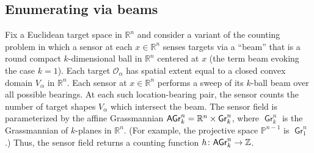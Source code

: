 \documentclass{psapm-l}
\theoremstyle{definition}
\theoremstyle{remark}
\numberwithin{equation}{section}
\begin{document}
\subsection{Enumerating via beams}
Fix a Euclidean target space in ${{\mathbb R}}^n$ and consider a variant of the counting problem in which a sensor at each $x\in{{\mathbb R}}^n$ senses targets via a ``beam'' that is a round compact $k$-dimensional ball in ${{\mathbb R}}^n$ centered at $x$ (the term beam evoking the case $k=1$). Each target ${{\mathcal O}}_\alpha$ has spatial extent equal to a closed convex domain $V_\alpha$ in ${{\mathbb R}}^n$. Each sensor at $x\in{{\mathbb R}}^n$ performs a sweep of its $k$-ball beam over all possible bearings. At each such location-bearing pair, the sensor counts the number of target shapes $V_\alpha$ which intersect the beam. The sensor field is parameterized by the affine Grassmannian  ${{\sf AGr}}_k^n={{\mathbb R}}^n\times{{{\operatorname{\mathsf{{Gr}}}}}}^n_k$, where ${{{\operatorname{\mathsf{{Gr}}}}}}^n_k$ is the Grassmannian of $k$-planes in ${{\mathbb R}}^n$. (For example, the projective space ${{\mathbb{P}}}^{n-1}$ is ${{{\operatorname{\mathsf{{Gr}}}}}}^n_1$.) Thus, the sensor field returns a counting function $h\colon{{\sf AGr}}_k^n\to{{\mathbb Z}}$.
\end{document}
